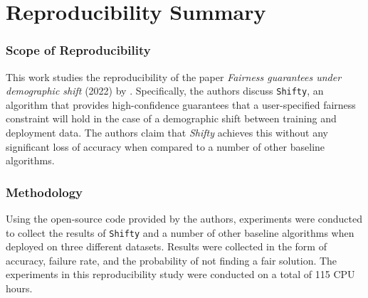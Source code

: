 \section*{\centering Reproducibility Summary}


\subsubsection*{Scope of Reproducibility}

This work studies the reproducibility of the paper \textit{Fairness guarantees under demographic shift} (2022) by \citeauthor{giguere2022fairness}. Specifically, the authors discuss \texttt{Shifty}, an algorithm that provides high-confidence guarantees that a user-specified fairness constraint will hold in the case of a demographic shift between training and deployment data. The authors claim that \textit{Shifty} achieves this without any significant loss of accuracy when compared to a number of other baseline algorithms.

\subsubsection*{Methodology}

Using the open-source code provided by the authors, experiments were conducted to collect the results of \texttt{Shifty} and a number of other baseline algorithms when deployed on three different datasets. Results were collected in the form of accuracy, failure rate, and the probability of not finding a fair solution. The experiments in this reproducibility study were conducted on a total of 115 CPU hours. 

